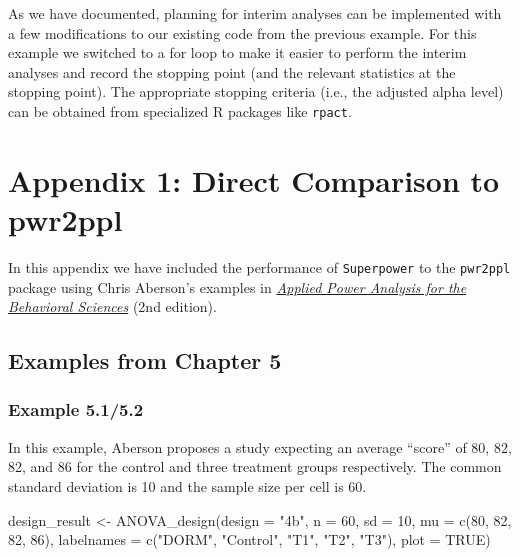 \documentclass[
]{book}
\newenvironment{Shaded}{\begin{snugshade}}{\end{snugshade}}
\newcommand{\AttributeTok}[1]{\textcolor[rgb]{0.77,0.63,0.00}{#1}}
\newcommand{\ConstantTok}[1]{\textcolor[rgb]{0.00,0.00,0.00}{#1}}
\newcommand{\DecValTok}[1]{\textcolor[rgb]{0.00,0.00,0.81}{#1}}
\newcommand{\FunctionTok}[1]{\textcolor[rgb]{0.00,0.00,0.00}{#1}}
\newcommand{\NormalTok}[1]{#1}
\newcommand{\OtherTok}[1]{\textcolor[rgb]{0.56,0.35,0.01}{#1}}
\newcommand{\StringTok}[1]{\textcolor[rgb]{0.31,0.60,0.02}{#1}}
\begin{document}
As we have documented, planning for interim analyses can be implemented with a few modifications to our existing code from the previous example. For this example we switched to a for loop to make it easier to perform the interim analyses and record the stopping point (and the relevant statistics at the stopping point). The appropriate stopping criteria (i.e., the adjusted alpha level) can be obtained from specialized R packages like \texttt{rpact}.

\hypertarget{appendix-1-direct-comparison-to-pwr2ppl}{%
\chapter*{Appendix 1: Direct Comparison to pwr2ppl}\label{appendix-1-direct-comparison-to-pwr2ppl}}

In this appendix we have included the performance of \texttt{Superpower} to the \texttt{pwr2ppl} package using Chris Aberson's examples in \href{https://www.crcpress.com/Applied-Power-Analysis-for-the-Behavioral-Sciences-2nd-Edition/Aberson/p/book/9781138044593}{\emph{Applied Power Analysis for the Behavioral Sciences}} (2nd edition).

\hypertarget{examples-from-chapter-5}{%
\section{Examples from Chapter 5}\label{examples-from-chapter-5}}

\hypertarget{example-5.15.2}{%
\subsection{Example 5.1/5.2}\label{example-5.15.2}}

In this example, Aberson proposes a study expecting an average ``score'' of 80, 82, 82, and 86 for the control and three treatment groups respectively. The common standard deviation is 10 and the sample size per cell is 60.

\begin{Shaded}
\begin{Highlighting}[]
\NormalTok{design\_result }\OtherTok{\textless{}{-}} \FunctionTok{ANOVA\_design}\NormalTok{(}\AttributeTok{design =} \StringTok{"4b"}\NormalTok{,}
                              \AttributeTok{n =} \DecValTok{60}\NormalTok{,}
                              \AttributeTok{sd =} \DecValTok{10}\NormalTok{,}
                              \AttributeTok{mu =} \FunctionTok{c}\NormalTok{(}\DecValTok{80}\NormalTok{, }\DecValTok{82}\NormalTok{, }\DecValTok{82}\NormalTok{, }\DecValTok{86}\NormalTok{),}
                              \AttributeTok{labelnames =} \FunctionTok{c}\NormalTok{(}\StringTok{"DORM"}\NormalTok{,}
                              \StringTok{"Control"}\NormalTok{,}
                              \StringTok{"T1"}\NormalTok{,}
                              \StringTok{"T2"}\NormalTok{,}
                              \StringTok{"T3"}\NormalTok{),}
                              \AttributeTok{plot =} \ConstantTok{TRUE}\NormalTok{)}
\end{Highlighting}
\end{Shaded}
\end{document}

